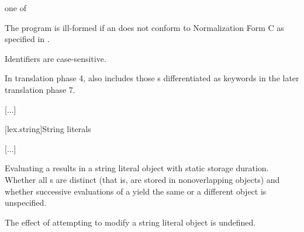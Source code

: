 \documentclass{wg21}
\begin{document}
\begin{bnf}
     \textnormal{one of}\br
\end{bnf}

\pnum
{}%
%
The program is ill-formed
if an  does not conform to
Normalization Form C as specified in .
\begin{note}
    Identifiers are case-sensitive.
\end{note}
\begin{note}
    In translation phase 4,
     also includes
    those s
    differentiated as keywords
    in the later translation phase 7.
\end{note}

\textcolor{noteclr}{[...]}

[lex.string]{String literals}

\textcolor{noteclr}{[...]}


\pnum
Evaluating a  results in a string literal object
with static storage duration.
%
Whether all s are distinct (that is, are stored in
nonoverlapping objects) and whether successive evaluations of a
 yield the same or a different object is
unspecified.
\begin{note}
    The effect of attempting to modify a string literal object is undefined.
\end{note}
\end{document}
